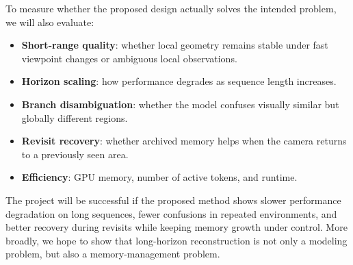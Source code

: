 \documentclass[10pt]{article}
\begin{document}
To measure whether the proposed design actually solves the intended problem, we will also evaluate:
\begin{itemize}[leftmargin=1.6em]
  \item \textbf{Short-range quality}: whether local geometry remains stable under fast viewpoint changes or ambiguous local observations.
  \item \textbf{Horizon scaling}: how performance degrades as sequence length increases.
  \item \textbf{Branch disambiguation}: whether the model confuses visually similar but globally different regions.
  \item \textbf{Revisit recovery}: whether archived memory helps when the camera returns to a previously seen area.
  \item \textbf{Efficiency}: GPU memory, number of active tokens, and runtime.
\end{itemize}

The project will be successful if the proposed method shows slower performance degradation on long sequences, fewer confusions in repeated environments, and better recovery during revisits while keeping memory growth under control. More broadly, we hope to show that long-horizon reconstruction is not only a modeling problem, but also a memory-management problem.
\end{document}
